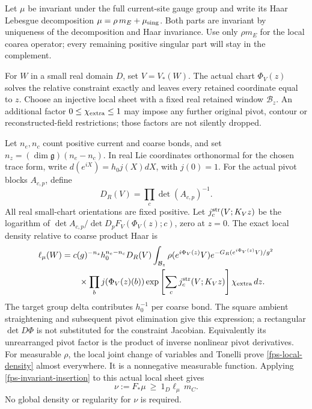 Let \(\mu\) be invariant under the full current-site gauge group and
write its Haar Lebesgue decomposition
\(\mu=\rho\,m_E+\mu_{\rm sing}\). Both parts are invariant by uniqueness
of the decomposition and Haar invariance. Use only \(\rho m_E\) for the
local coarea operator; every remaining positive singular part will stay
in the complement.

For \(W\) in a small real domain \(D\), set \(V=V_*(W)\). The actual
chart \(\Phi_V(z)\) solves the relative constraint exactly and leaves
every retained coordinate equal to \(z\). Choose an injective local
sheet with a fixed real retained window \(\mathcal B_z\). An additional
factor \(0\le\chi_{\rm extra}\le1\) may impose any further original
pivot, contour or reconstructed-field restrictions; those factors are
not silently dropped.

Let \(n_e,n_c\) count positive current and coarse bonds, and set
\(n_z=(\dim\mathfrak g)(n_e-n_c)\). In real Lie coordinates orthonormal
for the chosen trace form, write
\(d(e^{iX})=h_0j(X)dX\), with \(j(0)=1\).
For the actual pivot blocks \(A_{c,p}\), define
\[
 D_R(V)=\prod_c\det(A_{c,p})^{-1}.
\]
All real small-chart orientations are fixed positive. Let
\(j_c^{\rm str}(V;K_Vz)\) be the logarithm of
\(\det A_{c,p}/\det D_pF_V(\Phi_V(z);c)\), zero at \(z=0\).
The exact local density relative to coarse product Haar is
\begin{align}
 \ell_\mu(W)
 &=c(g)^{-n_s}h_0^{n_e-n_c}D_R(V)
   \int_{\mathcal B_z}\rho(e^{i\Phi_V(z)}V)
       e^{-G_R(e^{i\Phi_V(z)}V)/g^2}\notag\\
 &\qquad\times\prod_b j(\Phi_V(z)(b))
       \exp\left[\sum_c j_c^{\rm str}(V;K_Vz)\right]
       \chi_{\rm extra}\,dz.
 \label{fps-local-density}
\end{align}
The target group delta contributes \(h_0^{-1}\) per coarse bond.
The square ambient straightening and subsequent pivot elimination give
this expression; a rectangular \(\det D\Phi\) is not substituted for
the constraint Jacobian. Equivalently its unrearranged pivot factor is
the product of inverse nonlinear pivot derivatives.
For measurable \(\rho\), the local joint change of variables and
Tonelli prove \eqref{fps-local-density} almost everywhere. It is a
nonnegative measurable function. Applying
\eqref{fps-invariant-insertion} to this actual local sheet gives
\begin{equation}
 \nu:=F_*\mu\ \ge\ 1_D\ell_\mu\,m_C.
 \label{fps-local-domination}
\end{equation}
No global density or regularity for \(\nu\) is required.

